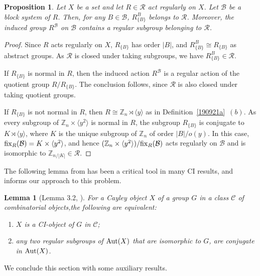 \documentclass[11pt]{amsart}
\numberwithin{equation}{section}
\newtheorem{lem}[thrm]{Lemma}
\newtheorem{prop}[thrm]{Proposition}
\theoremstyle{definition}
\newcounter{case}
\def\fix{{\rm fix}}
\def\Aut{{\rm Aut}}
\def\Z{{\mathbb Z}}
\begin{document}
	\begin{prop}\label{190921b} 
		Let $X$ be a set and let $R \in {\mathcal R}$ act regularly on $X$.  
		Let ${\mathcal B}$ be a block system of $R$. Then, for any $B \in {\mathcal B}$,  $R_{\{B\}}^B$ belongs to ${\mathcal R}$. 
		Moreover, the induced group $R^{\mathcal B}$ on ${\mathcal B}$ contains a regular subgroup belonging to ${\mathcal R}$.
	\end{prop}
	
	\begin{proof}
		Since $R$ acts regularly on $X$,  $R_{\{B\}}$ has order $|B|$, and $R_{\{B\}}^B \cong R_{\{B\}}$ as abstract groups. 
		As ${\mathcal R}$ is closed under taking subgroups, we have $R_{\{B\}}^B \in {\mathcal R}$.
		
		If $R_{\{B\}}$ is normal in $R$, then the induced action $R^{\mathcal B}$ is a regular action of the quotient group $R / R_{\{B\}}$. 
		The conclusion follows, since ${\mathcal R}$ is also closed under taking quotient groups.
		
		If $R_{\{B\}}$ is not normal in $R$, then $R \cong \Z_n \rtimes \langle y \rangle$ as in Definition~\ref{190921a}~$(b)$. 
		As every subgroup of $\Z_n \times \langle y^2 \rangle$ is normal in $R$, the subgroup $R_{\{B\}}$ is conjugate to $K \rtimes \langle y \rangle$, 
		where $K$ is the unique subgroup of $\Z_n$ of order $|B| / o(y)$. 
		In this case, $\fix_R({\mathcal B}) = K \times \langle y^2 \rangle$, and hence 
		$
		(\Z_n \times \langle y^2 \rangle )/ \fix_R({\mathcal B})
		$
		acts regularly on ${\mathcal B}$ and is isomorphic to $\Z_{n/|K|} \in {\mathcal R}$.
	\end{proof}
	
	The following lemma from \cite{Babai1977} has been a critical tool in many CI results, and informs our approach to this problem.
	
	\begin{lem}[Lemma 3.2, \cite{Babai1977}]\label{Babai lemma}
		For a Cayley object $X$ of a group $G$ in a class $\mathcal C$ of
		combinatorial objects,the following are equivalent:
		\begin{enumerate}
			\item $X$ is a CI-object of $G$ in $\mathcal C$;
			\item any two regular subgroups of $\Aut(X)$ that are isomorphic to $G$, are conjugate in $\Aut(X)$.
		\end{enumerate} 
	\end{lem}
	
	We conclude this section with some auxiliary results. 
	
\end{document}
